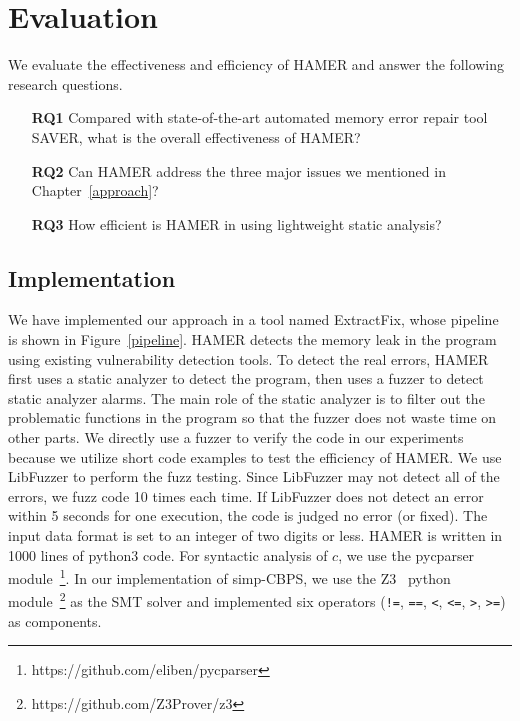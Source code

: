 \documentclass[a4paper,11pt,oneside,openany]{book}
\begin{document}

\chapter{Evaluation}
We evaluate the effectiveness and efficiency of HAMER and answer the following research questions.

\begin{itemize}
\item[\textbf{RQ1}] Compared with state-of-the-art automated memory error repair tool SAVER, what is the overall effectiveness of HAMER?
\item[\textbf{RQ2}] Can HAMER address the three major issues we mentioned in Chapter~\ref{approach}? 
\item[\textbf{RQ3}] How efficient is HAMER in using lightweight static analysis?
\end{itemize}

\section{Implementation}
We have implemented our approach in a tool named ExtractFix, whose pipeline is shown in Figure~\ref{pipeline}. HAMER detects the memory leak in the program using existing vulnerability detection tools. To detect the real errors, HAMER first uses a static analyzer to detect the program, then uses a fuzzer to detect static analyzer alarms. The main role of the static analyzer is to filter out the problematic functions in the program so that the fuzzer does not waste time on other parts. We directly use a fuzzer to verify the code in our experiments because we utilize short code examples to test the efficiency of HAMER. We use LibFuzzer to perform the fuzz testing. Since LibFuzzer may not detect all of the errors, we fuzz code 10 times each time. If LibFuzzer does not detect an error within 5 seconds for one execution, the code is judged no error (or fixed). The input data format is set to an integer of two digits or less. HAMER is written in 1000 lines of python3 code. For syntactic analysis of $c$, we use the pycparser module~\footnote{https://github.com/eliben/pycparser}. In our implementation of simp-CBPS, we use the Z3~\cite{z3} python module~\footnote{https://github.com/Z3Prover/z3} as the SMT solver and implemented six operators (\verb|!=|, \verb|==|, \verb|<|, \verb|<=|, \verb|>|, \verb|>=|) as components. 
\end{document}
